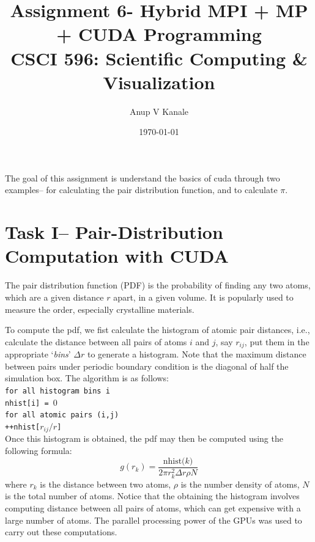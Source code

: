 \documentclass[11pt, oneside]{article}   	%
\title{\vspace{-6ex} Assignment 6- Hybrid MPI + MP + CUDA Programming \\ {CSCI 596: Scientific Computing \& Visualization}  \vspace{-2ex}}
\author{Anup V Kanale}
\date{\vspace{-2ex}\today}							%
\begin{document}
\maketitle \vspace{-5ex}

The goal of this assignment is understand the basics of cuda through two examples-- for calculating the pair distribution function, and to calculate $\pi$.

\vspace{-2ex}
\section{Task I-- Pair-Distribution Computation with CUDA}
\vspace{-2ex}The pair distribution function (PDF) is the probability of finding any two atoms, which are a given distance $r$ apart, in a given volume. It is popularly used to measure the order, especially crystalline materials.

To compute the pdf, we fist calculate the histogram of atomic pair distances, i.e., calculate the distance between all pairs of atoms $i$ and $j$, say $r_{ij}$, put them in the appropriate `\textit{bins}' $\Delta r$ to generate a histogram. Note that the maximum distance between pairs under periodic boundary condition is the diagonal of half the simulation box. The algorithm is as follows: \\
\noindent \texttt{for all histogram bins i} \\
\indent	\texttt{nhist[i] = $0$}\\
\texttt{for all atomic pairs (i,j)} \\
\indent	\texttt{++nhist[$r_{ij}/r$]} \\
Once this histogram is obtained, the pdf may then be computed using the following formula:
	\begin{equation}
		g(r_k) = \frac{\text{nhist($k$)}}{2 \pi r_k^2 \Delta r \rho N}
	\end{equation}
where $r_k$ is the distance between two atoms, $\rho$ is the number density of atoms, $N$ is the total number of atoms. Notice that the obtaining the histogram involves computing distance between all pairs of atoms, which can get expensive with a large number of atoms. The parallel processing power of the GPUs was used to carry out these computations.
\end{document}
